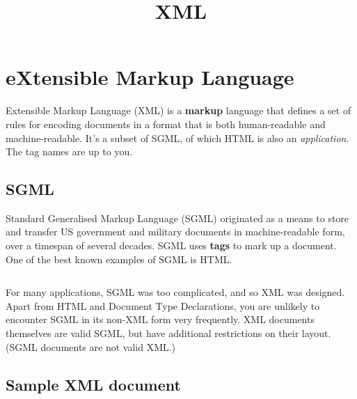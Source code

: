 \documentclass[slides]{pgnotes}
\title{XML}
\begin{document}
\maketitle




\section{eXtensible Markup Language}

Extensible Markup Language (XML) is a \textbf{markup} language that defines a set of rules for encoding documents in a format that is both human-readable and machine-readable.
It's a subset of SGML, of which HTML is also an \textit{application}. 
The tag names are up to you. 

\subsection{SGML}

Standard Generalised Markup Language (SGML) originated as a means to store and transfer US government and military documents in machine-readable form, over a timespan of several decades.
SGML uses \textbf{tags} to mark up a document.
One of the best known examples of SGML is HTML.

\inputminted{html}{htmlpage.html}

For many applications, SGML was too complicated, and so XML was designed.
Apart from HTML and Document Type Declarations, you are unlikely to encounter SGML in its non-XML form very frequently.
XML documents themselves are valid SGML, but have additional restrictions on their layout.
(SGML documents are not valid XML.)
 

\subsection{Sample XML document}
\end{document}
